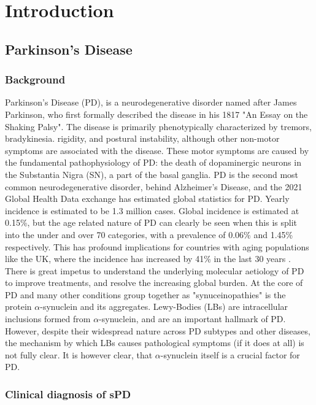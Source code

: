 \documentclass{article}
\begin{document}
\section{Introduction}
\subsection{Parkinson's Disease}
\subsubsection{Background}  
Parkinson's Disease (PD), is a neurodegenerative disorder named after James Parkinson, who first formally described the disease in his 1817 "An Essay on the Shaking Palsy"\cite{Parkinson2002AnPalsy}. The disease is primarily phenotypically characterized by tremors, bradykinesia. rigidity, and postural instability, although other non-motor symptoms are associated with the disease. These motor symptoms are caused by the fundamental pathophysiology of PD: the death of dopaminergic neurons in the Substantia Nigra (SN), a part of the basal ganglia. PD is the second most common neurodegenerative disorder, behind Alzheimer's Disease, and the 2021 Global Health Data exchange\cite{Ferrari2024Global2021} has estimated global statistics for PD. Yearly incidence is estimated to be 1.3 million cases. Global incidence is estimated at 0.15\%, but the age related nature of PD can clearly be seen when this is split into the under and over 70 categories, with a prevalence of 0.06\% and 1.45\% respectively. 
This has profound implications for countries with aging populations like the UK, where the incidence has increased by 41\% in the last 30 years \cite{Ferrari2024Global2021}. There is great impetus to understand the underlying molecular aetiology of PD to improve treatments, and resolve the increasing global burden.
At the core of PD and many other conditions group together as "synuceinopathies" is the protein $\alpha$-synuclein and its aggregates. Lewy-Bodies (LBs) are intracellular inclusions formed from $\alpha$-synuclein\cite{Spillantini1997-SynucleinBodies}, and are an important hallmark of PD. However, despite their widespread nature across PD subtypes and other diseases, the mechanism by which LBs causes pathological symptoms (if it does at all) is not fully clear\cite{Riederer2023LewyDisease}. It is however clear, that $\alpha$-synuclein itself is a crucial factor for PD.
\subsubsection{Clinical diagnosis of sPD}
\end{document}
